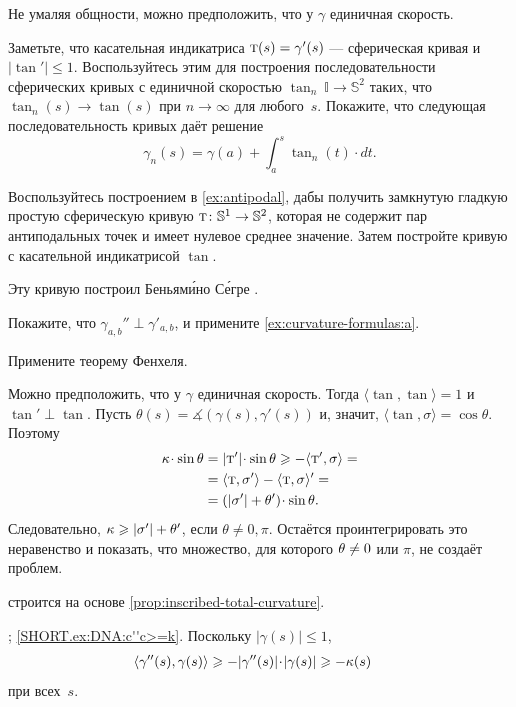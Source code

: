 \begin{multicols}{2}
Не умаляя общности, можно предположить, что у $\gamma$ единичная скорость.

Заметьте, что касательная индикатриса $\tan(s)\z=\gamma'(s)$ --- сферическая кривая и $|\tan'|\le 1$.
Воспользуйтесь этим для построения последовательности сферических кривых с единичной скоростью $\tan_n\:\mathbb{I}\to\mathbb{S}^2$ таких, что $\tan_n(s)\to \tan(s)$ при $n\to\infty$ для любого~$s$.
Покажите, что следующая последовательность кривых даёт решение
\[\gamma_n(s)=\gamma(a)+\int_a^s\tan_n(t)\cdot dt.\]

Воспользуйтесь построением в \ref{ex:antipodal}, дабы получить замкнутую гладкую простую сферическую кривую $\tan\:\mathbb{S}^1\z\to\mathbb{S}^2$, которая не содержит пар антиподальных точек и имеет нулевое среднее значение.
Затем постройте кривую с касательной индикатрисой $\tan$.

Эту кривую построил Беньям\'{и}но С\'{е}гре \cite{segre}.

Покажите, что $\gamma_{a,b}''\perp \gamma'_{a,b}$, и примените \ref{ex:curvature-formulas:a}.

Примените теорему Фенхеля.

Можно предположить, что у $\gamma$ единичная скорость.
Тогда $\langle\tan,\tan\rangle=1$ и  $\tan'\perp \tan$.
Пусть $\theta(s)=\measuredangle(\gamma(s),\gamma'(s))$ и, значит, $\langle \tan,\sigma\rangle=\cos\theta$.
Поэтому
\begin{align*}
\kur\cdot \sin\theta
&=|\tan'|\cdot \sin\theta\ge
-\langle \tan',\sigma\rangle=
\\
&=
\langle \tan,\sigma'\rangle-\langle \tan,\sigma\rangle'=
\\
&=
(|\sigma'|+\theta')\cdot \sin\theta.
\end{align*}
Следовательно, $\kappa\geqslant |\sigma'|+\theta'$,
если $\theta\ne0,\pi$.
Остаётся проинтегрировать это неравенство и показать, что множество, для которого $\theta\z\ne0$ или $\pi$, не создаёт проблем.

 строится на основе \ref{prop:inscribed-total-curvature}.

\parbf{\ref{ex:DNA}}; \ref{SHORT.ex:DNA:c''c>=k}.
Поскольку $|\gamma(s)|\le 1$, 
\begin{align*}
\langle\gamma''(s),\gamma(s)\rangle&\ge -|\gamma''(s)|\cdot|\gamma(s)|\ge-\kur(s)
\end{align*}
при всех~$s$.


\end{multicols}
